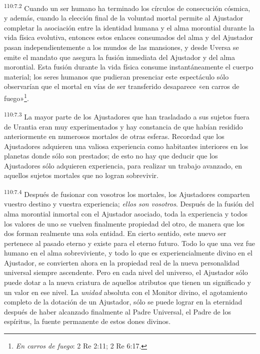 \par
\textsuperscript{110:7.2} Cuando un ser humano ha terminado los círculos de consecución cósmica, y además, cuando la elección final de la voluntad mortal permite al Ajustador completar la asociación entre la identidad humana y el alma morontial durante la vida física evolutiva, entonces estos enlaces consumados del alma y del Ajustador pasan independientemente a los mundos de las mansiones, y desde Uversa se emite el mandato que asegura la fusión inmediata del Ajustador y del alma morontial. Esta fusión durante la vida física consume instantáneamente el cuerpo material; los seres humanos que pudieran presenciar este espectáculo sólo observarían que el mortal en vías de ser transferido desaparece «en carros de fuego»\footnote{\textit{En carros de fuego}: 2 Re 2:11; 2 Re 6:17.}.

\par
\textsuperscript{110:7.3} La mayor parte de los Ajustadores que han trasladado a sus sujetos fuera de Urantia eran muy experimentados y hay constancia de que habían residido anteriormente en numerosos mortales de otras esferas. Recordad que los Ajustadores adquieren una valiosa experiencia como habitantes interiores en los planetas donde sólo son prestados; de esto no hay que deducir que los Ajustadores sólo adquieren experiencia, para realizar un trabajo avanzado, en aquellos sujetos mortales que no logran sobrevivir.

\par
\textsuperscript{110:7.4} Después de fusionar con vosotros los mortales, los Ajustadores comparten vuestro destino y vuestra experiencia; \textit{ellos son vosotros}. Después de la fusión del alma morontial inmortal con el Ajustador asociado, toda la experiencia y todos los valores de uno se vuelven finalmente propiedad del otro, de manera que los dos forman realmente una sola entidad. En cierto sentido, este nuevo ser pertenece al pasado eterno y existe para el eterno futuro. Todo lo que una vez fue humano en el alma sobreviviente, y todo lo que es experiencialmente divino en el Ajustador, se convierten ahora en la propiedad real de la nueva personalidad universal siempre ascendente. Pero en cada nivel del universo, el Ajustador sólo puede dotar a la nueva criatura de aquellos atributos que tienen un significado y un valor en ese nivel. La \textit{unidad} absoluta con el Monitor divino, el agotamiento completo de la dotación de un Ajustador, sólo se puede lograr en la eternidad después de haber alcanzado finalmente al Padre Universal, el Padre de los espíritus, la fuente permanente de estos dones divinos.

